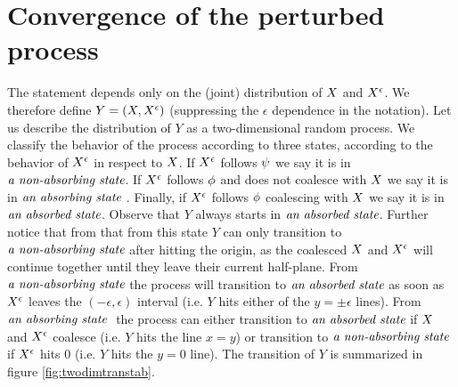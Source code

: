 {
\newpage

\section{Convergence of the perturbed process}
\label{sec:proof-of-lem:resamplede-to-sampled}

\newcommand{\bandwidth}{\delta}
\newcommand{\rotproc}{Y^\circ}
\newcommand{\union}{\cup}
\renewcommand{\L}{L^+ \union L^-}
\newcommand{\Le}{L^\epsilon}
\newcommand{\statenoweb}{\emph{\text{a non-absorbing state}}}
\newcommand{\statewebapart}{\emph{\text{an absorbing state }}}
\newcommand{\statewebtogether}{\emph{\text{an absorbed state}}}
\newcommand{\twodim}{Y}

The statement
\statementoflemresampledetosampled{} depends only on the
(joint) distribution of $X$ and $X^{\epsilon}$. We therefore define $\twodim=(\sampled, \resamplede)$ (suppressing the $\epsilon$ dependence in the notation). Let us describe the distribution of $\twodim$
 as a two-dimensional random process.
We classify the behavior of the process according to three states, according to
the behavior of $X^{\epsilon}$ in respect to $X$. If $X^{\epsilon}$ follows
$\psi$ we say it is in $\statenoweb$. If $X^{\epsilon}$ follows $\phi$
and does not coalesce with $X$ we say it is in $\statewebapart$. Finally,
if $X^{\epsilon}$ follows $\phi$ coalescing with $X$ we say it is in
$\statewebtogether$.  Observe that $\twodim$ always starts
in $\statewebtogether$. Further notice that from that from this state $\twodim$
can only transition to $\statenoweb$ after hitting the origin, as the coalesced
$X$ and $X^{\epsilon}$ will continue together until they leave their
current half-plane. From $\statenoweb$ the process will transition to
$\statewebtogether$ as soon as $X^{\epsilon}$ leaves the $(-\epsilon,\epsilon)$
interval (i.e. $\twodim$ hits either of the $y=\pm\epsilon$ lines). From
$\statewebapart$ the process can either transition to $\statewebtogether$
if $X$ and $X^{\epsilon}$ coalesce (i.e. $\twodim$ hits the line $x=y$)
or transition to $\statenoweb$ if $X^{\epsilon}$ hits $0$ (i.e. $\twodim$ hits
the $y=0$ line). The transition of $\twodim$ is summarized in figure
\ref{fig:twodimtranstab}.

}
